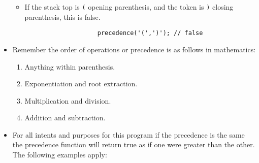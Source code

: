 \begin{itemize}
\begin{itemize}
            \item If the stack top is \verb|(| opening parenthesis, and the token is \verb|)| closing parenthesis, this is false.
                \begin{verbatim}
                    precedence('(',')'); // false
                \end{verbatim}
        \end{itemize}
    
    \item Remember the order of operations or precedence is as follows in mathematics:
        \begin{enumerate}
            \item Anything within parenthesis.
            \item Exponentiation and root extraction. 
            \item Multiplication and division.
            \item Addition and subtraction.
        \end{enumerate}
    
    \item For all intents and purposes for this program if the precedence is the same the precedence function will return true as if one were greater than the other. The following examples apply:
        
\end{itemize}
